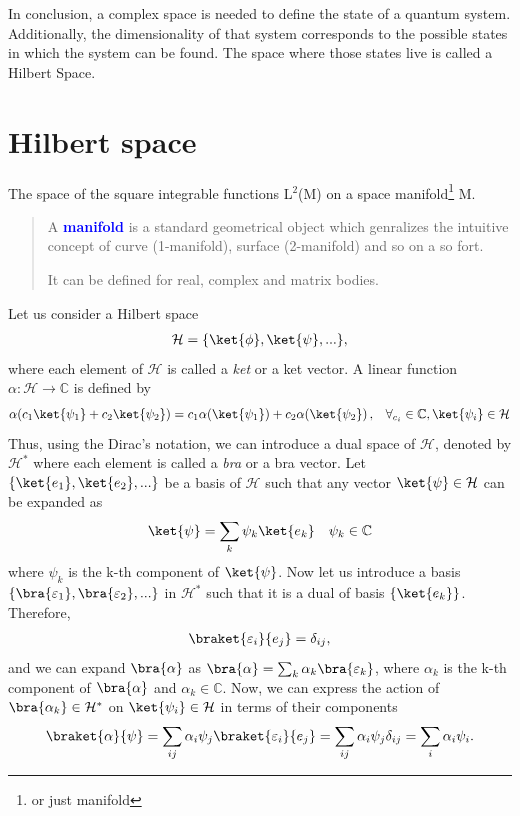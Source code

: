 \documentclass{article}
\begin{document}
In conclusion, a complex space is needed to define the state of a quantum system. Additionally, the dimensionality of that system corresponds to the possible states in which the system can be found. The space where those states live is called a Hilbert Space.

\section{Hilbert space}

The space of the square integrable functions L$^2$(M) on a space manifold\footnote{or just manifold} M.
\begin{quote}
  A \textcolor{blue}{\textbf{manifold}} is a standard geometrical object which genralizes the intuitive concept of curve (1-manifold), surface (2-manifold) and so on a so fort.

  It can be defined for real, complex and matrix bodies.
\end{quote}

Let us consider a Hilbert space
\begin{align}
  \mathcal{H}=\{\ket{\phi}, \ket{\psi},... \},
\end{align}
where each element of $\mathcal{H}$ is called a \textit{ket} or a ket vector. A linear function  $\alpha:\mathcal{H}\rightarrow \mathbb{C}$ is defined by
\begin{align}
  \alpha( c_1 \ket{\psi_1} + c_2\ket{\psi_2}) = c_1\alpha (\ket{\psi_1}) + c_2\alpha (\ket{\psi_2})\,,& & \forall_{c_i} \in \mathbb{C},\ket{\psi_i} \in \mathcal{H} 
\end{align}
Thus, using the Dirac's notation, we can introduce a dual space of $\mathcal{H}$, denoted by $\mathcal{H}^*$ where each element is called a \textit{bra} or a bra vector.
Let $\{\ket{e_1},\ket{e_2},...\}$ be a basis of $\mathcal{H}$ such that any vector $\ket{\psi} \in \mathcal{H}$ can be expanded as
\begin{align}
  \ket{\psi} = \sum_k \psi_k\ket{e_k} && \psi_k \in \mathbb{C}
\end{align}
where $\psi_k$ is the k-th component of $\ket{\psi}$.
Now let us introduce a basis $\{\bra{\varepsilon_1},\bra{\varepsilon_2},...\}$ in $\mathcal{H}^*$ such that it is a dual of basis $\{\ket{e_k}\}$. Therefore,
\begin{align}
  \braket{\varepsilon_i}{e_j}=\delta_{ij},
\end{align}
and we can expand $\bra{\alpha}$ as $\bra{\alpha}=\sum_k \alpha_k\bra{\varepsilon_k}$, where $\alpha_k$ is the k-th component of $\bra{\alpha}$ and $\alpha_k \in \mathbb{C}$. Now, we can express the action of $\bra{\alpha_k} \in \mathcal{H}^*$ on $\ket{\psi_i} \in \mathcal{H}$ in terms of their components
\begin{align}
  \braket{\alpha}{\psi}=\sum_{ij}\alpha_i \psi_j\braket{\varepsilon_i}{e_j} = \sum_{ij}\alpha_i \psi_j\delta_{ij} = \sum_{i}\alpha_i \psi_i.
\end{align}
\end{document}
